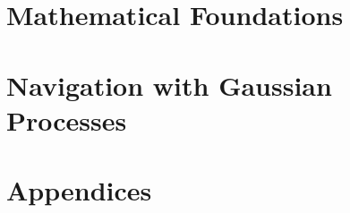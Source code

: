 \documentclass[
	12pt,
	UKenglish,
	a4paper
	]{book}
\numberwithin{figure}{chapter}
\numberwithin{table}{chapter}
\numberwithin{algorithm}{chapter}
\begin{document}




\part{Mathematical Foundations}











\part{Navigation with Gaussian Processes}









\part{Appendices}

\appendix





\printbibliography[heading=bibintoc]
\end{document}
